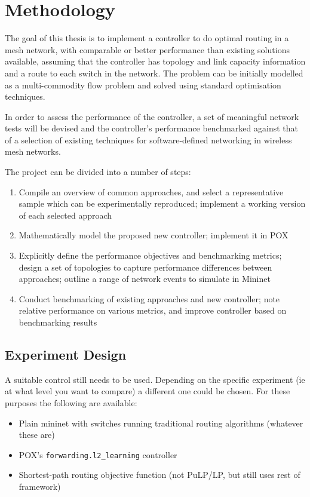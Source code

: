 \chapter{Methodology}

The goal of this thesis is to implement a controller to do optimal routing in a mesh network, with comparable or better performance than existing solutions available, assuming that the controller has topology and link capacity information and a route to each switch in the network. The problem can be initially modelled as a multi-commodity flow problem and solved using standard optimisation techniques.

In order to assess the performance of the controller, a set of meaningful network tests will be devised and the controller's performance benchmarked against that of a selection of existing techniques for software-defined networking in wireless mesh networks.

The project can be divided into a number of steps:

\begin{enumerate}
\item Compile an overview of common approaches, and select a representative sample which can be experimentally reproduced; implement a working version of each selected approach
\item Mathematically model the proposed new controller; implement it in POX
\item Explicitly define the performance objectives and benchmarking metrics; design a set of topologies to capture performance differences between approaches; outline a range of network events to simulate in Mininet 
\item Conduct benchmarking of existing approaches and new controller; note relative performance on various metrics, and improve controller based on benchmarking results
\end{enumerate}

\section{Experiment Design}
A suitable control still needs to be used. Depending on the specific experiment (ie at what level you want to compare) a different one could be chosen. For these purposes the following are available:

\begin{itemize}
\item Plain mininet with switches running traditional routing algorithms (whatever these are)
\item POX's \texttt{forwarding.l2\_learning} controller
\item Shortest-path routing objective function (not PuLP/LP, but still uses rest of framework)
\end{itemize}


